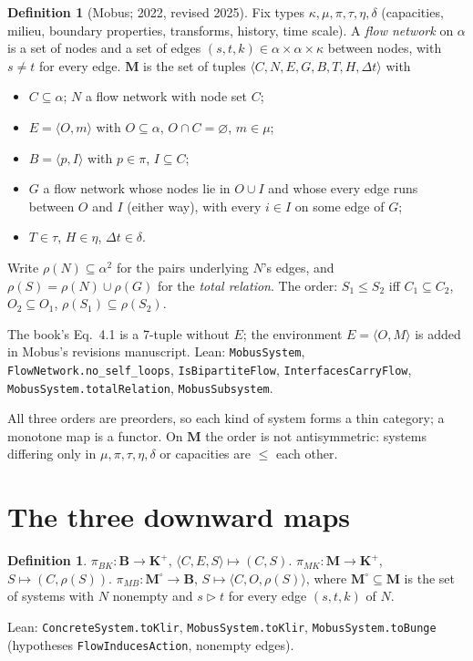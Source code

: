 \documentclass[11pt]{article}
\theoremstyle{definition}
\newtheorem{definition}[theorem]{Definition}
\theoremstyle{remark}
\newcommand{\Kp}{\mathbf{K}^{+}}
\newcommand{\B}{\mathbf{B}}
\newcommand{\M}{\mathbf{M}}
\newcommand{\Mo}{\mathbf{M}^{\circ}}
\newcommand{\acts}{\mathrel{\triangleright}}
\newcommand{\lean}[1]{\texttt{#1}}
\newcommand{\pBK}{\pi_{BK}}
\newcommand{\pMB}{\pi_{MB}}
\newcommand{\pMK}{\pi_{MK}}
\begin{document}
\begin{definition}[Mobus; 2022, revised 2025]
Fix types $\kappa,\mu,\pi,\tau,\eta,\delta$ (capacities, milieu, boundary properties, transforms, history, time scale). A \emph{flow network} on $\alpha$ is a set of nodes and a set of edges $(s,t,k)\in\alpha\times\alpha\times\kappa$ between nodes, with $s\neq t$ for every edge. $\M$ is the set of tuples $\langle C,N,E,G,B,T,H,\Delta t\rangle$ with
\begin{itemize}[nosep]
\item $C\subseteq\alpha$; $N$ a flow network with node set $C$;
\item $E=\langle O,m\rangle$ with $O\subseteq\alpha$, $O\cap C=\varnothing$, $m\in\mu$;
\item $B=\langle p,I\rangle$ with $p\in\pi$, $I\subseteq C$;
\item $G$ a flow network whose nodes lie in $O\cup I$ and whose every edge runs between $O$ and $I$ (either way), with every $i\in I$ on some edge of $G$;
\item $T\in\tau$, $H\in\eta$, $\Delta t\in\delta$.
\end{itemize}
Write $\rho(N)\subseteq\alpha^2$ for the pairs underlying $N$'s edges, and $\rho(S)=\rho(N)\cup\rho(G)$ for the \emph{total relation}. The order: $S_1\le S_2$ iff $C_1\subseteq C_2$, $O_2\subseteq O_1$, $\rho(S_1)\subseteq\rho(S_2)$.
\end{definition}
\noindent The book's Eq.~4.1 is a 7-tuple without $E$; the environment $E=\langle O,M\rangle$ is added in Mobus's revisions manuscript. Lean: \lean{MobusSystem}, \lean{FlowNetwork.no\_self\_loops}, \lean{IsBipartiteFlow}, \lean{InterfacesCarryFlow}, \lean{MobusSystem.totalRelation}, \lean{MobusSubsystem}.

All three orders are preorders, so each kind of system forms a thin category; a monotone map is a functor. On $\M$ the order is not antisymmetric: systems differing only in $\mu,\pi,\tau,\eta,\delta$ or capacities are $\le$ each other.

\section{The three downward maps}\label{sec:down}

\begin{definition}
$\pBK:\B\to\Kp$, $\langle C,E,S\rangle\mapsto(C,S)$.\quad
$\pMK:\M\to\Kp$, $S\mapsto(C,\rho(S))$.\quad
$\pMB:\Mo\to\B$, $S\mapsto\langle C,O,\rho(S)\rangle$, where $\Mo\subseteq\M$ is the set of systems with $N$ nonempty and $s\acts t$ for every edge $(s,t,k)$ of $N$.
\end{definition}
\noindent Lean: \lean{ConcreteSystem.toKlir}, \lean{MobusSystem.toKlir}, \lean{MobusSystem.toBunge} (hypotheses \lean{FlowInducesAction}, nonempty edges).
\end{document}
